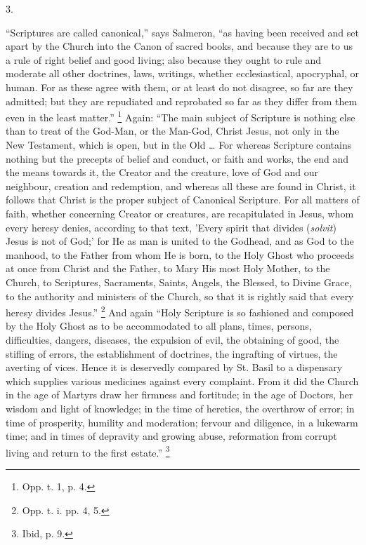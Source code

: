 3.

``Scriptures are called canonical,'' says Salmeron,
``as having been received and set apart by the Church into the
Canon of sacred books, and because they are to us a rule of right
belief and good living; also because they ought to rule and moderate
all other doctrines, laws, writings, whether ecclesiastical,
apocryphal, or human. For as these agree with them, or at least do not
disagree, so far are they admitted; but they are repudiated and
reprobated so far as they differ from them even in the least
matter.'' \footnote{Opp. t. 1, p. 4.} Again:
``The main subject of Scripture is nothing else than to treat of
the God-Man, or the Man-God, Christ Jesus, not only in the New
Testament, which is open, but in the Old … For whereas Scripture
contains nothing but the precepts of belief and conduct, or faith and
works, the end and the means towards it, the Creator and the creature,
love of God and our neighbour, creation and redemption, and whereas
all these are found in Christ, it follows that Christ is the proper
subject of Canonical Scripture. For all matters of faith, whether
concerning Creator or creatures, are recapitulated in Jesus, whom
every heresy denies, according to that text, 'Every spirit that
divides (\emph{solvit}) Jesus is not of God;' for He as man is united
to the Godhead, and as God to the manhood, to the Father from whom He
is born, to the Holy Ghost who proceeds at once from Christ and the
Father, to Mary His most Holy Mother, to the Church, to Scriptures,
Sacraments, Saints, Angels, the Blessed, to Divine Grace, to the
authority and ministers of the Church, so that it is rightly said that
every heresy divides Jesus.'' \footnote{Opp. t. i. pp. 4, 5.} And again ``Holy Scripture is so fashioned and composed
by the Holy Ghost as to be accommodated to all plans, times, persons,
difficulties, dangers, diseases, the expulsion of evil, the obtaining
of good, the stifling of errors, the establishment of doctrines, the
ingrafting of virtues, the averting of vices. Hence it is deservedly
compared by St. Basil to a dispensary which supplies various medicines
against every complaint. From it did the Church in the age of Martyrs
draw her firmness and fortitude; in the age of Doctors, her wisdom and
light of knowledge; in the time of heretics, the overthrow of error;
in time of prosperity, humility and moderation; fervour and diligence,
in a lukewarm time; and in times of depravity and growing abuse,
reformation from corrupt living and return to the first estate.''
\footnote{Ibid, p. 9.}

